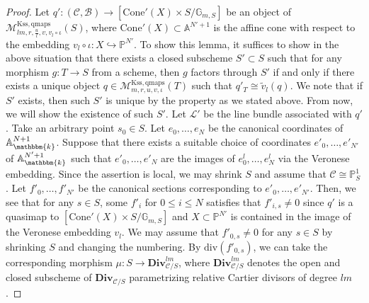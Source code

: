 \documentclass[12pt,twoside]{amsart}
\theoremstyle{definition}
\begin{document}
\begin{proof}
    Let $q'\colon (\mathcal{C},\mathcal{B})\to [\mathrm{Cone}'(X)\times S/\mathbb{G}_{m,S}]$ be an object of $\mathcal{M}^{\mathrm{Kss,qmaps}}_{lm,r,\frac{u}{l},v,v_l\circ\iota}(S)$, where $\mathrm{Cone}'(X)\subset\mathbb{A}^{N'+1}$ is the affine cone with respect to the embedding $v_l\circ\iota\colon X\hookrightarrow \mathbb{P}^{N'}$.
To show this lemma, it suffices to show in the above situation that there exists a closed subscheme $S'\subset S$ such that for any morphism $g\colon T\to S$ from a scheme, then $g$ factors through $S'$ if and only if there exists a unique object $q\in \mathcal{M}^{\mathrm{Kss,qmaps}}_{m,r,u,v,\iota}(T)$ such that $q'_T\cong\tilde{v}_l(q)$.
We note that if $S'$ exists, then such $S'$ is unique by the property as we stated above.
From now, we will show the existence of such $S'$.
    Let $\mathscr{L}'$ be the line bundle associated with $q'$.
    Take an arbitrary point $s_0\in S$.
    Let $e_0,\ldots,e_{N}$ be the canonical coordinates of $\mathbb{A}^{N+1}_{\mathbbm{k}}$.
Suppose that there exists a suitable choice of coordinates $e'_0,\ldots,e'_{N'}$ of $\mathbb{A}^{N'+1}_{\mathbbm{k}}$ such that $e'_0,\ldots,e'_{N}$ are the images of $e_0^l,\ldots, e_N^l$ via the Veronese embedding.
Since the assertion is local, we may shrink $S$ and assume that $\mathcal{C}\cong\mathbb{P}^1_S$.
Let $f'_0,\ldots,f'_{N'}$ be the canonical sections corresponding to $e'_0,\ldots,e'_{N'}$.
Then, we see that for any $s\in S$, some $f'_i$ for $0\le i\le N$ satisfies that $f'_{i,s}\not=0$ since $q'$ is a quasimap to $[\mathrm{Cone}'(X)\times S/\mathbb{G}_{m,S}]$ and $X\subset \mathbb{P}^{N'}$ is contained in the image of the Veronese embedding $v_l$. 
We may assume that $f'_{0,s}\not=0$ for any $s\in S$ by shrinking $S$ and changing the numbering.
By $\mathrm{div}(f'_{0,s})$, we can take the corresponding morphism $\mu\colon S\to \mathbf{Div}^{lm}_{\mathcal{C}/S}$, where $\mathbf{Div}^{lm}_{\mathcal{C}/S}$ denotes the open and closed subscheme of $\mathbf{Div}_{\mathcal{C}/S}$ parametrizing relative Cartier divisors of degree $lm$.


\end{proof}
\end{document}
